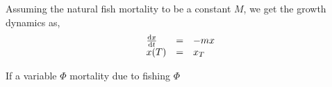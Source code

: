 
Assuming the natural fish mortality to be a constant $M$, we get the growth dynamics as,
\begin{equation}
\begin{array}{lll}
\frac{\mathrm{d} x}{{\mathrm{d} t}}&=&-mx\\
x(T)&=&x_T
\end{array}
\end{equation}

If a variable $\Phi$ mortality due to fishing $\Phi$

